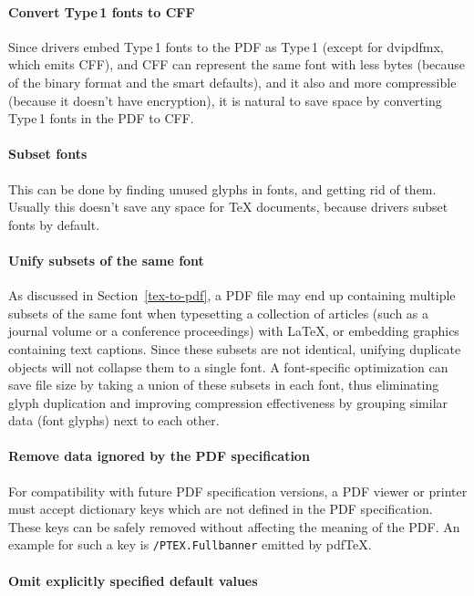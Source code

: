 \documentclass{ltugproc}
\def\cmd{\textsf}
\begin{document}
\paragraph{Convert Type\,1 fonts to CFF}

Since drivers embed Type\,1 fonts to the PDF as Type\,1 (except for
\cmd{dvipdfmx}, which emits CFF), and CFF can represent the same font with
less bytes (because of the binary format and the smart defaults), and it also
and more compressible (because it doesn't have encryption), it is natural to
save space by converting Type\,1 fonts in the PDF to CFF.

\paragraph{Subset fonts}

This can be done by finding unused glyphs in fonts, and getting rid of them.
Usually this doesn't save any space for \TeX{} documents, because drivers
subset fonts by default.

\paragraph{Unify subsets of the same font}

As discussed in Section~\ref{tex-to-pdf}, a PDF file may end up containing
multiple subsets of the same font when typesetting a collection of articles
(such as a journal volume or a conference proceedings) with \LaTeX{}, or
embedding graphics containing text captions. Since these subsets are not
identical, unifying duplicate objects will not collapse them to a single
font. A font-specific optimization can save file size by taking a
union of these subsets in each font, thus eliminating glyph duplication and
improving compression effectiveness by grouping similar data (font glyphs)
next to each other.

\paragraph{Remove data ignored by the PDF specification}

For compatibility with future PDF specification versions, a PDF viewer or 
printer must accept dictionary keys which are not defined in the PDF
specification. These keys can be safely removed without affecting the
meaning of the PDF. An example for such a key is \texttt{/PTEX.Fullbanner}
emitted by pdf\TeX{}.

\paragraph{Omit explicitly specified default values}
\end{document}
